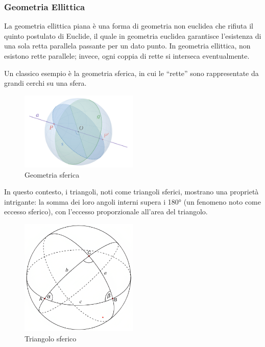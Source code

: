\subsubsection{Geometria Ellittica}

La geometria ellittica piana è una forma di geometria non euclidea che rifiuta il quinto postulato di Euclide, il quale in geometria euclidea garantisce l'esistenza di una sola retta parallela passante per un dato punto. In geometria ellittica, non esistono rette parallele; invece, ogni coppia di rette si interseca eventualmente.

Un classico esempio è la geometria sferica, in cui le “rette” sono rappresentate da grandi cerchi su una sfera.

\begin{figure}[H]
    \centering
    \includegraphics[width=0.5\textwidth]{assets/spherical_geometry.png}
    \caption{Geometria sferica}
\end{figure}

In questo contesto, i triangoli, noti come triangoli sferici, mostrano una proprietà intrigante: la somma dei loro angoli interni supera i 180° (un fenomeno noto come eccesso sferico), con l'eccesso proporzionale all'area del triangolo.

\begin{figure}[H]
    \centering
    \includegraphics[width=0.5\textwidth]{assets/spherical_triangle.png}
    \caption{Triangolo sferico}
\end{figure}

